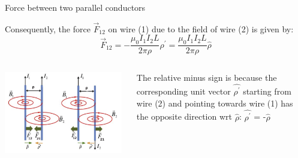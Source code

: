\begin{frame}{Force between two parallel conductors}

Consequently, the force $\vec{F}_{12}$ on wire (1) due to the field of wire (2) is given by:
\begin{equation*}
  \vec{F}_{12} = - \frac{\mu_0 I_{1} I_{2} L}{2\pi \rho} \hat{\rho^{\prime}} = \frac{\mu_0 I_{1} I_{2} L}{2\pi \rho} \hat{\rho}
\end{equation*}

\begin{columns}
  \begin{column}{0.70\textwidth}
    \begin{center}
      \includegraphics[width=0.98\textwidth]{./images/schematics/magnetic_force_between_wires_2_cases_03.png}\\
    \end{center}
  \end{column}
  \begin{column}{0.30\textwidth}
     The relative minus sign is because the corresponding unit vector $\hat{\rho^{\prime}}$ starting
     from wire (2) and pointing towards wire (1) has the opposite direction wrt $\hat{\rho}$:
     $\hat{\rho^{\prime}}$ = -$\hat{\rho}$
  \end{column}
\end{columns}

\end{frame}


%
%
%

